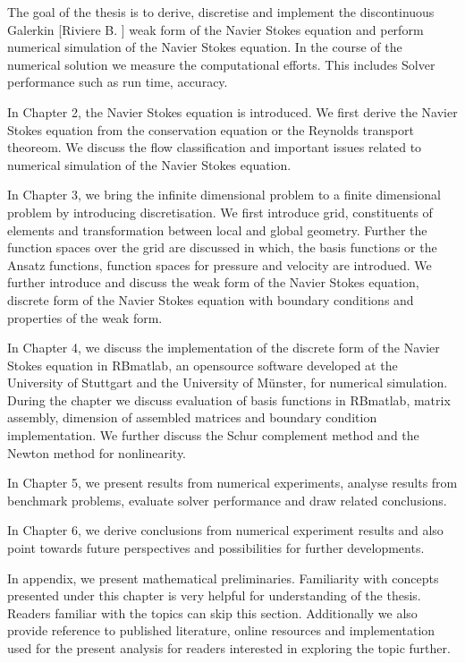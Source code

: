 \documentclass[a4paper,openany]{book}
\begin{document}
The goal of the thesis is to derive, discretise and implement the discontinuous Galerkin [Riviere B. \cite{riviere}] weak form of the Navier Stokes equation and perform numerical simulation of the Navier Stokes equation. In the course of the numerical solution we measure the computational efforts. This includes Solver performance such as run time, accuracy.

In Chapter 2, the Navier Stokes equation is introduced. We first derive the Navier Stokes equation from the conservation equation or the Reynolds transport theoreom. We discuss the flow classification and important issues related to numerical simulation of the Navier Stokes equation. 

In Chapter 3, we bring the infinite dimensional problem to a finite dimensional problem by introducing discretisation. We first introduce grid, constituents of elements and transformation between local and global geometry. Further the function spaces over the grid are discussed in which, the basis functions or the Ansatz functions, function spaces for pressure and velocity are introdued. We further introduce and discuss the weak form of the Navier Stokes equation, discrete form of the Navier Stokes equation with boundary conditions and properties of the weak form.

In Chapter 4, we discuss the implementation of the discrete form of the Navier Stokes equation in RBmatlab, an opensource software developed at the University of Stuttgart and the University of M\"unster, for numerical simulation. During the chapter we discuss evaluation of basis functions in RBmatlab, matrix assembly, dimension of assembled matrices and boundary condition implementation. We further discuss the Schur complement method and the Newton method for nonlinearity.

In Chapter 5, we present results from numerical experiments, analyse results from benchmark problems, evaluate solver performance and draw related conclusions.

In Chapter 6, we derive conclusions from numerical experiment results and also point towards future perspectives and possibilities for further developments.

In appendix, we present mathematical preliminaries. Familiarity with concepts presented under this chapter is very helpful for understanding of the thesis. Readers familiar with the topics can skip this section. Additionally we also provide reference to published literature, online resources and implementation used for the present analysis for readers interested in exploring the topic further.
\end{document}
